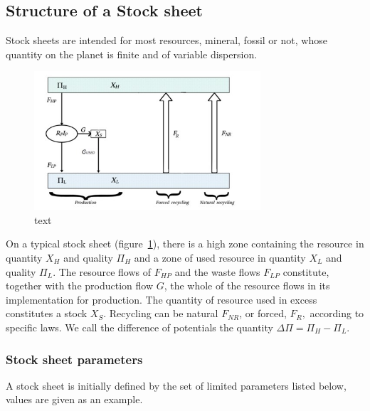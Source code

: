 \documentclass[12pt,a4paper]{article}%
\begin{document}
\subsection{Structure of a Stock sheet}

Stock sheets are intended for most resources, mineral, fossil or not, whose quantity on the planet is finite and of variable dispersion.

\begin{figure}[h]
	\centering
	\includegraphics[width=0.75\textwidth]{figures/FeuilleStock.jpg}
	\caption{text}
	\label{fig:StockSheet}
\end{figure}

On a typical stock sheet (figure~\ref{fig:StockSheet}), there is a high zone containing the resource in quantity $X_{H}$ and quality $\Pi_{H}$ and a zone of used resource in quantity $X_{L}$ and quality $\Pi_{L}$. The resource flows of $F_{HP}$ and the waste flows $F_{LP}$ constitute, together with the production flow $G$, the whole of the resource flows in its implementation for production.
The quantity of resource used in excess constitutes a stock $X_{S}$. Recycling can be natural $F_{NR}$, or forced, $F_{R},$ according to specific laws. We call the difference of potentials the quantity $\Delta \Pi=\Pi_{H}-\Pi_{L}$.



\subsubsection{Stock sheet parameters}

A stock sheet is initially defined by the set of limited parameters listed below, values are given as an example.
\end{document}
